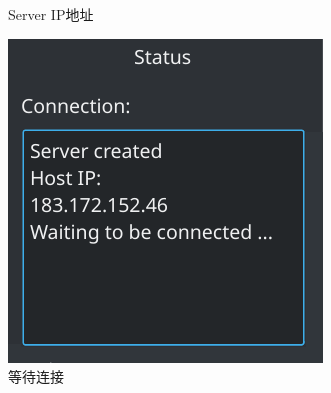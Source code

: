 \documentclass[a4paper,10pt]{article}
\begin{document}
\begin{enumerate}
\begin{figure}[htbp]
\begin{minipage}{.3\textwidth}
                                                        \caption{Server IP地址}
                                                        \label{fig6}
                                                \end{minipage}
                                                \begin{minipage}{.3\textwidth}
                                                        \centering
                                                        \includegraphics[width=.7\textwidth]{serverwaiting.png}
                                                        \caption{等待连接}
                                                        \label{fig7}
                                                \end{minipage}
                                        \end{figure}


\end{enumerate}
\end{document}
